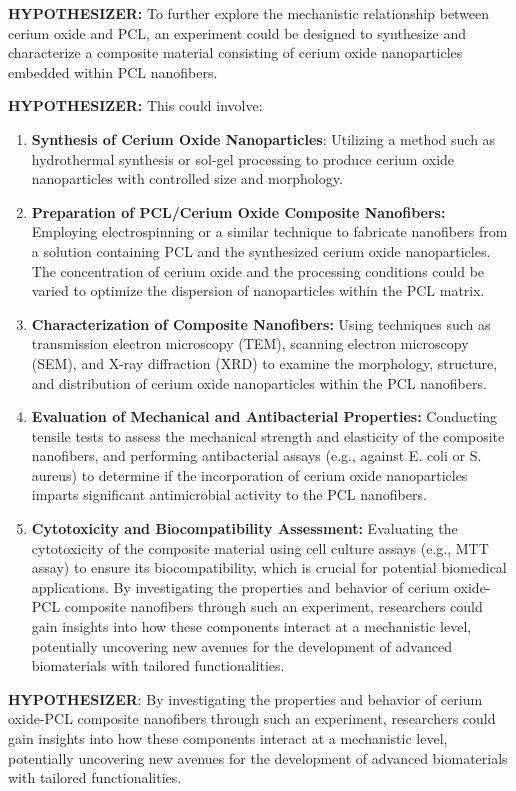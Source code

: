 \documentclass{article}
\begin{document}
\begin{leftbubbles}
\textbf{HYPOTHESIZER: } To further explore the mechanistic relationship between cerium oxide and PCL, an experiment could be designed to synthesize and characterize a composite material consisting of cerium oxide nanoparticles embedded within PCL nanofibers. 

\textbf{HYPOTHESIZER:} This could involve:
\begin{enumerate}
    \item \textbf{Synthesis of Cerium Oxide Nanoparticles}: Utilizing a method such as hydrothermal synthesis or sol-gel processing to produce cerium oxide nanoparticles with controlled size and morphology.
    \item \textbf{Preparation of PCL/Cerium Oxide Composite Nanofibers: }Employing electrospinning or a similar technique to fabricate nanofibers from a solution containing PCL and the synthesized cerium oxide nanoparticles. The concentration of cerium oxide and the processing conditions could be varied to optimize the dispersion of nanoparticles within the PCL matrix.
    \item \textbf{Characterization of Composite Nanofibers:} Using techniques such as transmission electron microscopy (TEM), scanning electron microscopy (SEM), and X-ray diffraction (XRD) to examine the morphology, structure, and distribution of cerium oxide nanoparticles within the PCL nanofibers.
    \item \textbf{Evaluation of Mechanical and Antibacterial Properties:} Conducting tensile tests to assess the mechanical strength and elasticity of the composite nanofibers, and performing antibacterial assays (e.g., against E. coli or S. aureus) to determine if the incorporation of cerium oxide nanoparticles imparts significant antimicrobial activity to the PCL nanofibers.
    \item \textbf{Cytotoxicity and Biocompatibility Assessment:} Evaluating the cytotoxicity of the composite material using cell culture assays (e.g., MTT assay) to ensure its biocompatibility, which is crucial for potential biomedical applications.
By investigating the properties and behavior of cerium oxide-PCL composite nanofibers through such an experiment, researchers could gain insights into how these components interact at a mechanistic level, potentially uncovering new avenues for the development of advanced biomaterials with tailored functionalities.
\end{enumerate}

\textbf{HYPOTHESIZER}: By investigating the properties and behavior of cerium oxide-PCL composite nanofibers through such an experiment, researchers could gain insights into how these components interact at a mechanistic level, potentially uncovering new avenues for the development of advanced biomaterials with tailored functionalities.
\end{leftbubbles}
\end{document}
